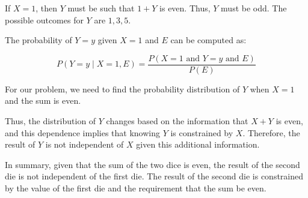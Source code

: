 \documentclass[letter]{article}
\theoremstyle{definition}
\newenvironment{soln}{
	\leavevmode\color{black}\ignorespaces
}{}
\begin{document}
\begin{enumerate}
\begin{soln}
			If \(X = 1\), then \(Y\) must be such that \(1 + Y\) is even. Thus, \(Y\) must be odd. The possible outcomes for \(Y\) are \(1, 3, 5\).

			
			The probability of \(Y = y\) given \(X = 1\) and \(E\) can be computed as:

			\[
			P(Y = y \mid X = 1, E) = \frac{P(X = 1 \text{ and } Y = y \text{ and } E)}{P(E)}
			\]

			For our problem, we need to find the probability distribution of \(Y\) when \(X = 1\) and the sum is even.

			Thus, the distribution of \(Y\) changes based on the information that \(X + Y\) is even, and this dependence implies that knowing \(Y\) is constrained by \(X\). Therefore, the result of \(Y\) is not independent of \(X\) given this additional information.

			In summary, given that the sum of the two dice is even, the result of the second die is not independent of the first die. The result of the second die is constrained by the value of the first die and the requirement that the sum be even.
		\end{soln}
	\end{enumerate}
	
\end{document}
